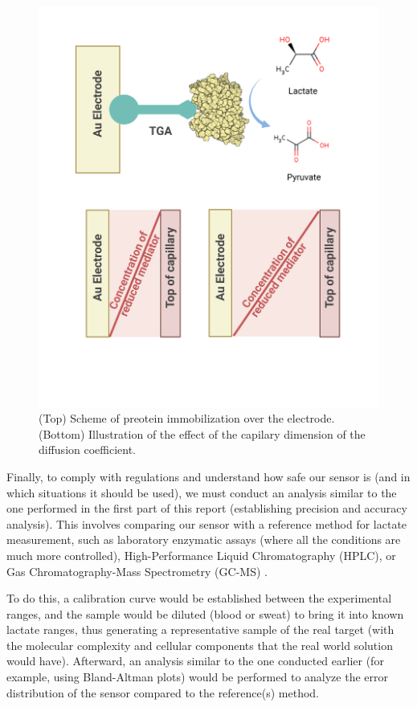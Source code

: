 \documentclass[conference]{IEEEtran}
\begin{document}
\begin{figure}[t]
   \centering
   \includegraphics[width=0.9\columnwidth]{images/electrode preparation.png}
   \caption{(Top) Scheme of preotein immobilization over the electrode. (Bottom) Illustration of the effect of the capilary dimension of the diffusion coefficient.}
   \label{fig:reaction}
\end{figure}

Finally, to comply with regulations and understand how safe our sensor is (and in which situations it should be used), we must conduct an analysis similar to the one performed in 
the first part of this report (establishing precision and accuracy analysis). This involves comparing our sensor with a reference method for lactate measurement, such as 
laboratory enzymatic assays (where all the conditions are much more controlled), High-Performance Liquid Chromatography (HPLC), or Gas Chromatography-Mass Spectrometry 
(GC-MS) \cite{toffalettiBloodLactateBiochemistry1991}.

To do this, a calibration curve would be established between the experimental ranges, and the sample would be diluted (blood or sweat) to bring it into known lactate ranges, 
thus generating a representative sample of the real target (with the molecular complexity and cellular components that the real world solution would have). 
Afterward, an analysis similar to the one conducted earlier (for example, using Bland-Altman plots) would be performed to analyze the error distribution of the sensor compared 
to the reference(s) method.
\end{document}
